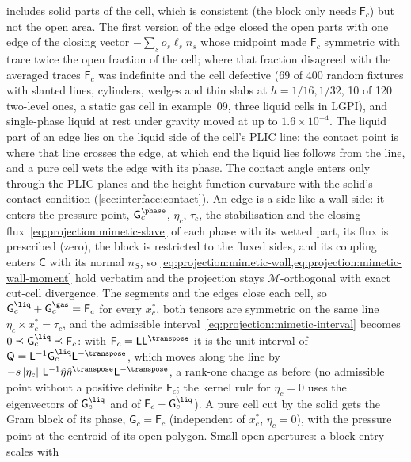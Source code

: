 includes solid parts of the cell, which is consistent (the block only needs
$\mathsf F_c$) but not the open area. The first version of the edge closed the
open parts with one edge of the closing vector $-\sum_so_s\ell_sn_s$ whose
midpoint made $\mathsf F_c$ symmetric with trace twice the open fraction of the
cell; where that fraction disagreed with the averaged traces $\mathsf F_c$ was
indefinite and the cell defective (69 of 400 random fixtures with slanted
lines, cylinders, wedges and thin slabs at $h=1/16,1/32$, 10 of 120 two-level
ones, a static gas cell in example~09, three liquid cells in LGPI), and
single-phase liquid at rest under gravity moved at up to $1.6\times10^{-4}$.
The liquid part of an edge lies on the liquid side of the cell's PLIC line:
the contact point is where that line crosses the edge, at which end the liquid
lies follows from the line, and a pure cell wets the edge with its phase. The
contact angle enters only through the PLIC planes and the height-function
curvature with the solid's contact condition (\cref{sec:interface:contact}).
An edge is a side like a wall side: it enters the pressure point,
$\mathsf G^{\phase}_c$, $\eta_c$, $\tau_c$, the stabilisation and the closing
flux~\cref{eq:projection:mimetic-slave} of each phase with its wetted part,
its flux is prescribed (zero), the block is restricted to the fluxed sides,
and its coupling enters $\mathsf C$ with its normal $n_S$, so
\cref{eq:projection:mimetic-wall,eq:projection:mimetic-wall-moment} hold
verbatim and the projection stays $\mathcal M$-orthogonal with exact cut-cell
divergence. The segments and the edges close each cell, so
$\mathsf G^{\liq}_c+\mathsf G^{\gas}_c=\mathsf F_c$ for every $x^{*}_c$, both
tensors are symmetric on the same line $\eta_c\times x^{*}_c=\tau_c$, and the
admissible interval~\cref{eq:projection:mimetic-interval} becomes
$0\preceq\mathsf G^{\liq}_c\preceq\mathsf F_c$: with
$\mathsf F_c=\mathsf L\mathsf L^{\transpose}$ it is the unit interval of
$\mathsf Q=\mathsf L^{-1}\mathsf G^{\liq}_c\mathsf L^{-\transpose}$, which moves
along the line by $-s\abs{\eta_c}\,\mathsf L^{-1}\hat\eta\hat\eta^{\transpose}\mathsf L^{-\transpose}$,
a rank-one change as before (no admissible point without a positive definite
$\mathsf F_c$; the kernel rule for $\eta_c=0$ uses the eigenvectors of
$\mathsf G^{\liq}_c$ and of $\mathsf F_c-\mathsf G^{\liq}_c$). A pure cell cut
by the solid gets the Gram block of its phase, $\mathsf G_c=\mathsf F_c$
(independent of $x^{*}_c$, $\eta_c=0$), with the pressure point at the
centroid of its open polygon. Small open apertures: a block entry scales with
